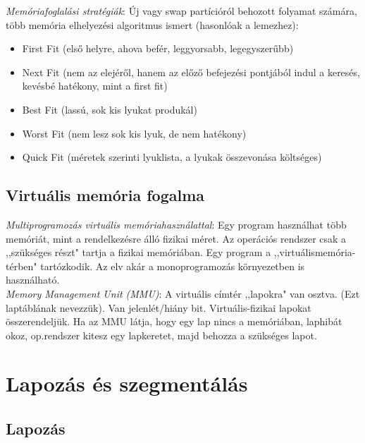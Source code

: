 \documentclass[margin=0px]{article}
\begin{document}
\textit{Memóriafoglalási stratégiák}: Új vagy swap partícióról behozott folyamat számára, több memória elhelyezési	algoritmus ismert (hasonlóak a lemezhez):
\begin{itemize}
    \item First Fit (első helyre, ahova befér, leggyorsabb, legegyszerűbb)
    \item Next Fit (nem az elejéről, hanem az előző befejezési pontjából indul a keresés, kevésbé hatékony, mint a first fit)
    \item Best Fit (lassú, sok kis lyukat produkál)
    \item Worst Fit (nem lesz sok kis lyuk, de nem hatékony)
    \item Quick Fit (méretek szerinti lyuklista, a lyukak összevonása költséges)
\end{itemize}

\subsection{Virtuális memória fogalma}

\textit{Multiprogramozás virtuális memóriahasználattal}: Egy program használhat több memóriát,
mint a rendelkezésre álló fizikai méret. Az operációs rendszer csak a ,,szükséges részt" tartja a fizikai memóriában. Egy program a ,,virtuálismemória-térben" tartózkodik. Az elv akár a monoprogramozás környezetben is használható. \\
\textit{Memory Management Unit (MMU)}: A virtuális címtér ,,lapokra" van osztva. (Ezt laptáblának
nevezzük). Van jelenlét/hiány bit. Virtuális-fizikai lapokat összerendeljük. Ha az MMU látja, hogy egy lap nincs a memóriában, laphibát okoz, op.rendszer kitesz egy lapkeretet, majd behozza a szükséges lapot.

\section{Lapozás és szegmentálás}

\subsection{Lapozás}
\end{document}
